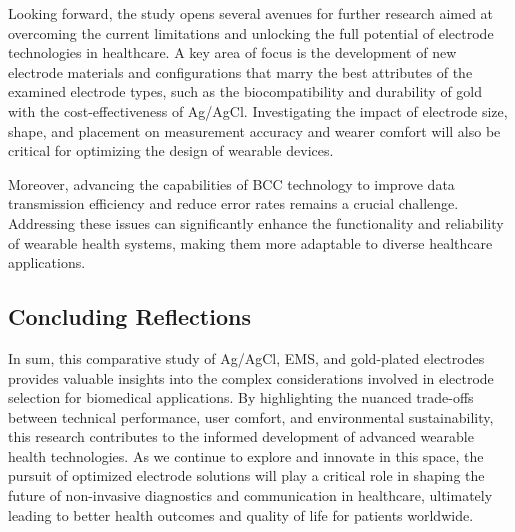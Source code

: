 \documentclass[conference]{IEEEtran}
\begin{document}
Looking forward, the study opens several avenues for further research aimed at overcoming the current limitations and unlocking the full potential of electrode technologies in healthcare. A key area of focus is the development of new electrode materials and configurations that marry the best attributes of the examined electrode types, such as the biocompatibility and durability of gold with the cost-effectiveness of Ag/AgCl. Investigating the impact of electrode size, shape, and placement on measurement accuracy and wearer comfort will also be critical for optimizing the design of wearable devices.

Moreover, advancing the capabilities of \gls{BCC} technology to improve data transmission efficiency and reduce error rates remains a crucial challenge. Addressing these issues can significantly enhance the functionality and reliability of wearable health systems, making them more adaptable to diverse healthcare applications.

\subsection{Concluding Reflections}

In sum, this comparative study of Ag/AgCl, EMS, and gold-plated electrodes provides valuable insights into the complex considerations involved in electrode selection for biomedical applications. By highlighting the nuanced trade-offs between technical performance, user comfort, and environmental sustainability, this research contributes to the informed development of advanced wearable health technologies. As we continue to explore and innovate in this space, the pursuit of optimized electrode solutions will play a critical role in shaping the future of non-invasive diagnostics and communication in healthcare, ultimately leading to better health outcomes and quality of life for patients worldwide.







\end{document}

